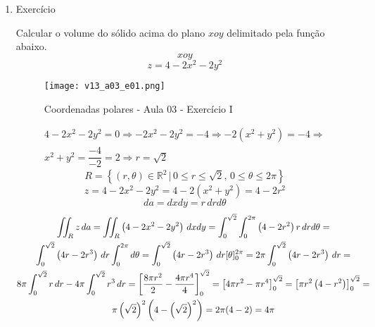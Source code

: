 \begin{enumerate}
	\item Exercício
	
	Calcular o volume do sólido acima do plano $xoy$ delimitado pela função abaixo.
	\begin{equation*}
		xoy
	\end{equation*}
	\begin{equation*}
		z = 4 - 2x^2 - 2y^2
	\end{equation*}
	
	\begin{figure}[htb]
		\caption{Coordenadas polares - Aula 03 - Exercício I}
		\label{v13_a03_e01}
		\centering
		\texttt{[image: v13\_a03\_e01.png]}		
	\end{figure}
	
	\begin{gather*}
		4 - 2x^2 - 2y^2 = 0 \Rightarrow -2x^2 - 2y^2 = - 4 \Rightarrow - 2\left(x^2 + y^2\right) = -4 \Rightarrow\\ x^2 + y^2 = \dfrac{-4}{-2} = 2 \Rightarrow r = \sqrt{2}
	\end{gather*}
	\begin{equation*}
		R = \left\{(r, \theta) \in \mathbb{R}^2 \,|\, 0 \leq r \leq \sqrt{2},\, 0 \leq \theta \leq 2\pi\right\}
	\end{equation*}
	\begin{equation*}
		z = 4 - 2x^2 - 2y^2 = 4 - 2\left(x^2 + y^2\right) = 4 - 2r^2
	\end{equation*}
	\begin{equation*}
		da = dxdy = r\, drd\theta
	\end{equation*}
	\begin{gather*}
		\iint_R z\, da = \iint_R \left(4 - 2x^2 - 2y^2\right)\, dxdy = \int_0^{\sqrt{2}} \int_0^{2\pi} \left(4 - 2r^2\right) r\, drd\theta =\\ \int_0^{\sqrt{2}} \left(4r - 2r^3\right) \, dr \int_0^{2\pi} d\theta = \int_0^{\sqrt{2}} \left(4r - 2r^3\right) \, dr [\theta]_0^{2\pi} = 2\pi\int_0^{\sqrt{2}} \left(4r - 2r^3\right) \, dr =\\ 8\pi\int_0^{\sqrt{2}} r\, dr - 4\pi\int_0^{\sqrt{2}} r^3\, dr = \left[\dfrac{8\pi r^2}{2} - \dfrac{\overstrike{4}\pi r^4}{\overstrike{4}}\right]_0^{\sqrt{2}} = \left[4\pi r^2 - \pi r^4\right]_0^{\sqrt{2}} = \left[\pi r^2\left(4 - r^2\right)\right]_0^{\sqrt{2}} =\\ \pi \left(\sqrt{2}\right)^2\left(4 - \left(\sqrt{2}\right)^2\right) = 2\pi(4 - 2) = 4\pi
	\end{gather*}
\end{enumerate}